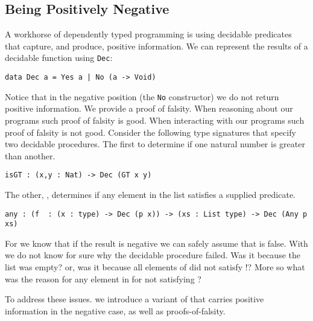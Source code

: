 \subsection{Being Positively Negative}
\label{sec:idioms:posneg}

A workhorse of dependently typed programming is using decidable
predicates that capture, and produce, positive information.
We can represent the results of a decidable function using \texttt{Dec}:

\begin{verbatim}
data Dec a = Yes a | No (a -> Void)
\end{verbatim}

\noindent
Notice that in the negative position (the \texttt{No} constructor) we do not return positive information.
We provide a proof of falsity.
When reasoning about our programs such proof of falsity is good.
When interacting with our programs such proof of falsity is not good.
Consider the following type signatures that specify two decidable procedures.
The first to determine if one natural number is greater than another.

\begin{verbatim}
isGT : (x,y : Nat) -> Dec (GT x y)
\end{verbatim}

\noindent
The other, , determines if any element in the list satisfies a supplied predicate.

\begin{verbatim}
any : (f  : (x : type) -> Dec (p x)) -> (xs : List type) -> Dec (Any p xs)
\end{verbatim}

For  we know that if the result is negative we can safely assume that   is false.
With  we do not know for sure why the decidable procedure failed.
Was it because the list was empty?
or,
was it because all elements of  did not satisfy !?
More so what was the reason for any element in  for not satisfying ?

To address these issues. we introduce  a variant of  that carries positive information in the negative case, as well as proofs-of-falsity.


